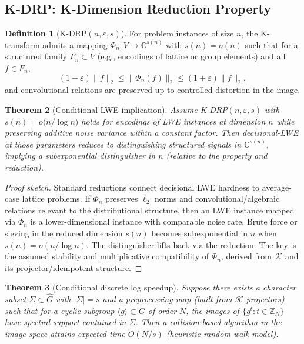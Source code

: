 \documentclass[11pt]{article}
\theoremstyle{plain}
\newtheorem{theorem}{Theorem}[section]
\theoremstyle{definition}
\newtheorem{definition}[theorem]{Definition}
\theoremstyle{remark}
\begin{document}
\subsection{K-DRP: K-Dimension Reduction Property}
\begin{definition}[K-DRP$(n,\varepsilon,s)$]
For problem instances of size $n$, the K-transform admits a mapping $\Phi_n : V \to \mathbb{C}^{s(n)}$ with $s(n) = o(n)$ such that for a structured family $F_n \subset V$ (e.g., encodings of lattice or group elements) and all $f \in F_n$,
\[
    (1-\varepsilon) \lVert f \rVert_2 \le \lVert \Phi_n(f) \rVert_2 \le (1+\varepsilon) \lVert f \rVert_2,
\]
and convolutional relations are preserved up to controlled distortion in the image.
\end{definition}
\begin{theorem}[Conditional LWE implication]\label{thm:lwe}
Assume K-DRP$(n,\varepsilon,s)$ with $s(n) = o\bigl(n/\log n\bigr)$ holds for encodings of LWE instances at dimension $n$ while preserving additive noise variance within a constant factor. Then decisional-LWE at those parameters reduces to distinguishing structured signals in $\mathbb{C}^{s(n)}$, implying a subexponential distinguisher in $n$ (relative to the property and reduction).
\end{theorem}
\begin{proof}[Proof sketch]
Standard reductions connect decisional LWE hardness to average-case lattice problems. If $\Phi_n$ preserves $\ell_2$ norms and convolutional/algebraic relations relevant to the distributional structure, then an LWE instance mapped via $\Phi_n$ is a lower-dimensional instance with comparable noise rate. Brute force or sieving in the reduced dimension $s(n)$ becomes subexponential in $n$ when $s(n) = o(n/\log n)$. The distinguisher lifts back via the reduction. The key is the assumed stability and multiplicative compatibility of $\Phi_n$, derived from $\mathcal{K}$ and its projector/idempotent structure.
\end{proof}
\begin{theorem}[Conditional discrete log speedup]\label{thm:dlog}
Suppose there exists a character subset $\Sigma \subset \widehat{G}$ with $|\Sigma| = s$ and a preprocessing map (built from $\mathcal{K}$-projectors) such that for a cyclic subgroup $\langle g \rangle \subset G$ of order $N$, the images of $\{g^t : t \in \mathbb{Z}_N\}$ have spectral support contained in $\Sigma$. Then a collision-based algorithm in the image space attains expected time $\tilde{O}(N/s)$ (heuristic random walk model).
\end{theorem}
\end{document}
